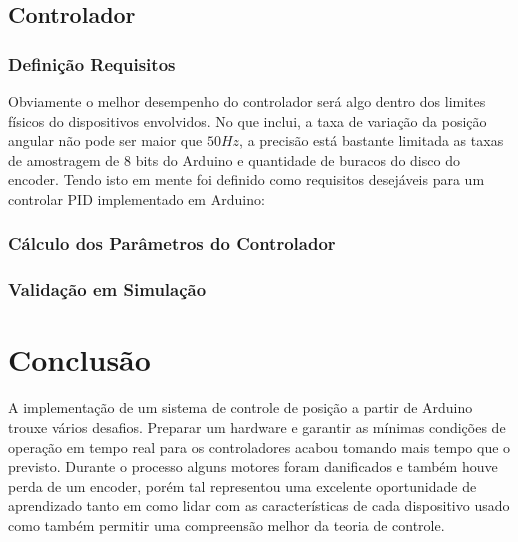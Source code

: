 \documentclass[a4paper,11pt]{article}
\begin{document}

\subsection{Controlador}

\subsubsection{Definição Requisitos}

Obviamente o melhor desempenho do controlador será algo dentro dos limites físicos do dispositivos envolvidos. No que inclui, a taxa de variação da posição angular não pode ser maior que $50Hz$, a precisão está bastante limitada as taxas de amostragem de 8 bits do Arduino e quantidade de buracos do disco do encoder. Tendo isto em mente foi definido como requisitos desejáveis para um controlar PID implementado em Arduino:



\subsubsection{Cálculo dos Parâmetros do Controlador}


\subsubsection{Validação em Simulação}


\section{Conclusão}

A implementação de um sistema de controle de posição a partir de Arduino trouxe vários desafios. Preparar um hardware e garantir as mínimas condições de operação em tempo real para os controladores acabou tomando mais tempo que o previsto. Durante o processo alguns motores foram danificados e também houve perda de um encoder, porém tal representou uma excelente oportunidade de aprendizado tanto em como lidar com as características de cada dispositivo usado como também permitir uma compreensão melhor da teoria de controle.
\end{document}

